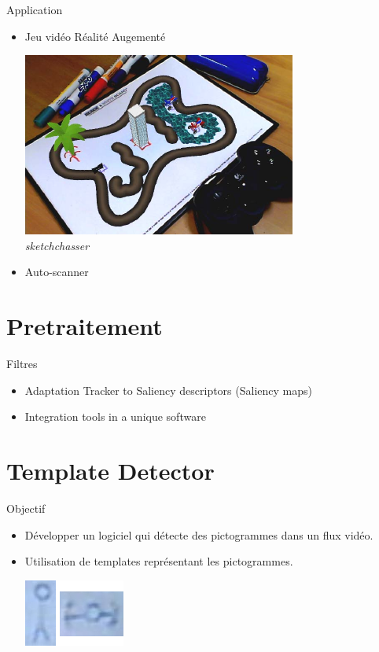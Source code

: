 \documentclass[t,14pt]{beamer}
\begin{document}
\begin{frame}{Application }
\vspace{2mm}
\begin{itemize}
\item Jeu vidéo Réalité Augementé

\begin{center}
\includegraphics[scale=0.5]{images/sketchchasser.png}
\textit{\\sketchchasser}
\end{center}
\item Auto-scanner 
\end{itemize}
\end{frame}

\section[Pré-traitement]{Pretraitement}
\vspace{5mm}
\begin{frame}{Filtres}
\vspace{5mm}
\begin{itemize}[<+->]
\item Adaptation Tracker to Saliency descriptors (Saliency maps)
\item Integration tools in a unique software
\end{itemize}
\end{frame}

\section[Détection de Pictogrammes]{Template Detector}
\begin{frame}{Objectif}
\vspace{5mm}
\begin{itemize}
\item Développer un logiciel qui détecte des pictogrammes dans un flux vidéo.
\item Utilisation de templates représentant les pictogrammes.
\vspace{5mm}
\begin{center}
\includegraphics[scale=0.66]{images/templates.png}
\end{center}
\end{itemize}
\end{frame}
\end{document}
